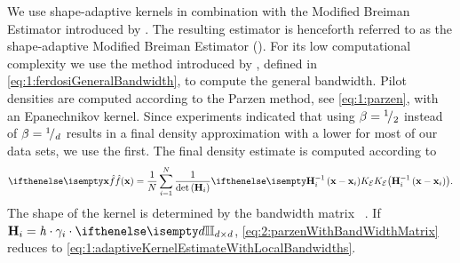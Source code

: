 
	We use shape-adaptive kernels in combination with the Modified Breiman Estimator introduced by \textcite{wilkinson1995dataplot}. The resulting estimator is henceforth referred to as the shape-adaptive Modified Breiman Estimator (\sambe).
	For its low computational complexity we use the method introduced by \citeauthor{ferdosi2011comparison}, defined in \cref{eq:1:ferdosiGeneralBandwidth}, to compute the general bandwidth.
	Pilot densities are computed according to the Parzen method, see \cref{eq:1:parzen}, with an Epanechnikov kernel.
	Since experiments indicated that using $\beta = {}^{1}\!/_{2}$ instead of $\beta = {}^{1}\!/_{d}$ results in a final density approximation with a lower \MSE for most of our data sets, we use the first.
	The final density estimate is computed according to
	\begin{equation}\label{eq:2:parzenWithBandWidthMatrix}
		\varEstimatedDensityFunction{\varPattern} = \frac{1}{\varNumPatterns}\sum_{\itXis = 1}^{\varNumPatterns} \frac{1}{\det\left(\varBandwidthMatrix[\itXis]\right)}\varKernel[\varEpan]{\varBandwidthMatrix[\itXis]^{-1}\left(\varPattern - \varPattern[\itXis]\right)}.
	\end{equation}
	The shape of the kernel \varKernel[\varEpan]{\bullet} is determined by the bandwidth matrix \varBandwidthMatrix[\itXis]~\cite{hardle2012nonparametric}. If $\varBandwidthMatrix[\itXis] = \varBandwidth \cdot \varLocalBandwidth{\itXis} \cdot \identityMatrix{\varDim}$, \cref{eq:2:parzenWithBandWidthMatrix} reduces to \cref{eq:1:adaptiveKernelEstimateWithLocalBandwidths}.

